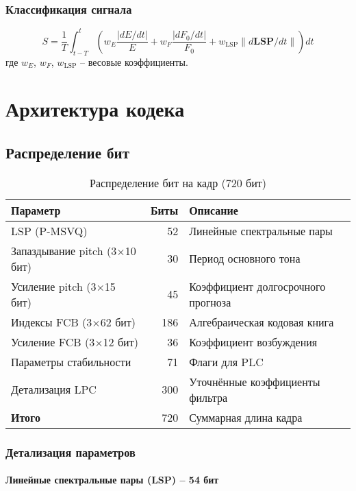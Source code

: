 \documentclass{report}
\begin{document}
	\subsection{Классификация сигнала}
	\begin{equation}
		S = \frac{1}{T} \int_{t-T}^{t} \left( w_E \frac{|dE/dt|}{E} + w_F \frac{|dF_0/dt|}{F_0} + w_{\text{LSP}} \|d\mathbf{LSP}/dt\| \right) dt
	\end{equation}
	где $w_E$, $w_F$, $w_{\text{LSP}}$ -- весовые коэффициенты.
	
	\chapter{Архитектура кодека}
	\section{Распределение бит}
	\begin{table}[H]
		\centering
		\caption{Распределение бит на кадр (720 бит)}
		\begin{tabular}{lrl}
			\toprule
			\textbf{Параметр} & \textbf{Биты} & \textbf{Описание} \\
			\midrule
			LSP (P-MSVQ) & 52 & Линейные спектральные пары \\
			Запаздывание pitch (3$\times$10 бит) & 30 & Период основного тона \\
			Усиление pitch (3$\times$15 бит) & 45 & Коэффициент долгосрочного прогноза \\
			Индексы FCB (3$\times$62 бит) & 186 & Алгебраическая кодовая книга \\
			Усиление FCB (3$\times$12 бит) & 36 & Коэффициент возбуждения \\
			Параметры стабильности & 71 & Флаги для PLC \\
			Детализация LPC & 300 & Уточнённые коэффициенты фильтра \\
			\bottomrule
			\textbf{Итого} & 720 & Суммарная длина кадра \\
			\bottomrule
		\end{tabular}
	\end{table}
	
	\subsection{Детализация параметров}
	
	\subsubsection{Линейные спектральные пары (LSP) -- 54 бит}
	
\end{document}
